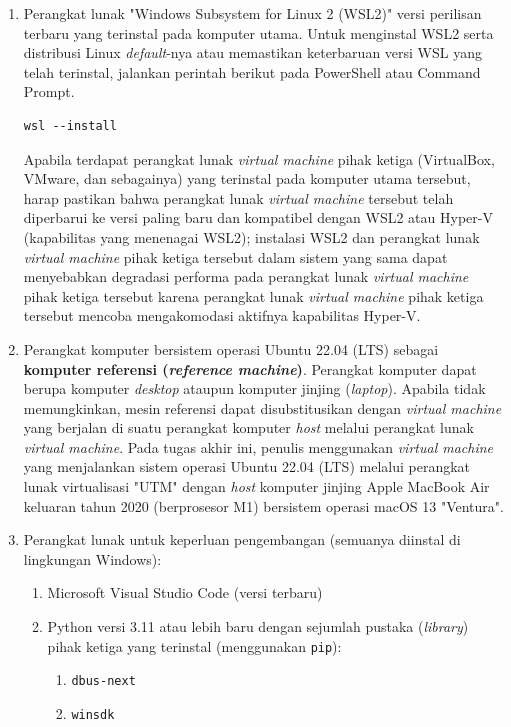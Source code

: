 \begin{enumerate}
    \item Perangkat lunak "Windows Subsystem for Linux 2 (WSL2)" versi perilisan terbaru yang terinstal pada komputer utama. Untuk menginstal WSL2 serta distribusi Linux \textit{default}-nya atau memastikan keterbaruan versi WSL yang telah terinstal, jalankan perintah berikut pada PowerShell atau Command Prompt.
    \begin{lstlisting}
wsl --install\end{lstlisting}
    Apabila terdapat perangkat lunak \textit{virtual machine} pihak ketiga (VirtualBox, VMware, dan sebagainya) yang terinstal pada komputer utama tersebut, harap pastikan bahwa perangkat lunak \textit{virtual machine} tersebut telah diperbarui ke versi paling baru dan kompatibel dengan WSL2 atau Hyper-V (kapabilitas yang menenagai WSL2); instalasi WSL2 dan perangkat lunak \textit{virtual machine} pihak ketiga tersebut dalam sistem yang sama dapat menyebabkan degradasi performa pada perangkat lunak \textit{virtual machine} pihak ketiga tersebut karena perangkat lunak \textit{virtual machine} pihak ketiga tersebut mencoba mengakomodasi aktifnya kapabilitas Hyper-V.

    \item Perangkat komputer bersistem operasi Ubuntu 22.04 (LTS) sebagai \textbf{komputer referensi (\textit{reference machine})}. Perangkat komputer dapat berupa komputer \textit{desktop} ataupun komputer jinjing (\textit{laptop}). Apabila tidak memungkinkan, mesin referensi dapat disubstitusikan dengan \textit{virtual machine} yang berjalan di suatu perangkat komputer \textit{host} melalui perangkat lunak \textit{virtual machine}. Pada tugas akhir ini, penulis menggunakan \textit{virtual machine} yang menjalankan sistem operasi Ubuntu 22.04 (LTS) melalui perangkat lunak virtualisasi "UTM" dengan \textit{host} komputer jinjing Apple MacBook Air keluaran tahun 2020 (berprosesor M1) bersistem operasi macOS 13 "Ventura".

    \item Perangkat lunak untuk keperluan pengembangan (semuanya diinstal di lingkungan Windows):
    \begin{enumerate}
        \item Microsoft Visual Studio Code (versi terbaru)
        \item Python versi 3.11 atau lebih baru dengan sejumlah pustaka (\textit{library}) pihak ketiga yang terinstal (menggunakan \verb|pip|):
        \begin{enumerate}
            \item \verb|dbus-next|
            \item \verb|winsdk|
        \end{enumerate}
    \end{enumerate}
    

\end{enumerate}
